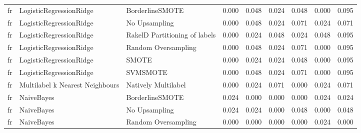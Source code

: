 \begin{tabular}{lllllllll}
      fr &         LogisticRegressionRidge &               BorderlineSMOTE &     0.000 &                     0.048 &                 0.024 &                  0.048 &                                   0.000 &     0.095 \\
      fr &         LogisticRegressionRidge &                 No Upsampling &     0.000 &                     0.048 &                 0.024 &                  0.071 &                                   0.024 &     0.071 \\
      fr &         LogisticRegressionRidge & RakelD Partitioning of labels &     0.000 &                     0.024 &                 0.048 &                  0.024 &                                   0.048 &     0.095 \\
      fr &         LogisticRegressionRidge &           Random Oversampling &     0.000 &                     0.048 &                 0.024 &                  0.071 &                                   0.000 &     0.095 \\
      fr &         LogisticRegressionRidge &                         SMOTE &     0.000 &                     0.024 &                 0.024 &                  0.048 &                                   0.000 &     0.095 \\
      fr &         LogisticRegressionRidge &                      SVMSMOTE &     0.000 &                     0.048 &                 0.024 &                  0.071 &                                   0.000 &     0.095 \\
      fr & Multilabel k Nearest Neighbours &           Natively Multilabel &     0.000 &                     0.024 &                 0.071 &                  0.000 &                                   0.024 &     0.071 \\
      fr &                      NaiveBayes &               BorderlineSMOTE &     0.024 &                     0.000 &                 0.000 &                  0.000 &                                   0.024 &     0.024 \\
      fr &                      NaiveBayes &                 No Upsampling &     0.024 &                     0.024 &                 0.000 &                  0.048 &                                   0.000 &     0.048 \\
      fr &                      NaiveBayes &           Random Oversampling &     0.000 &                     0.000 &                 0.000 &                  0.000 &                                   0.024 &     0.000 \\

\end{tabular}

